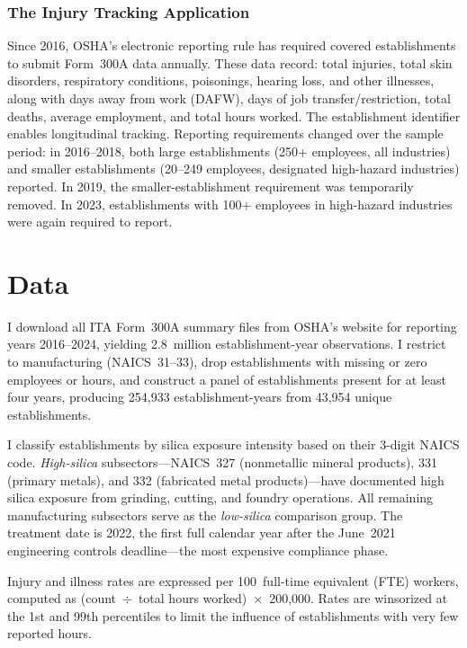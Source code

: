 \documentclass[12pt]{article}
\begin{document}
\subsubsection*{The Injury Tracking Application}
Since 2016, OSHA's electronic reporting rule has required covered establishments to submit Form~300A data annually. These data record: total injuries, total skin disorders, respiratory conditions, poisonings, hearing loss, and other illnesses, along with days away from work (DAFW), days of job transfer/restriction, total deaths, average employment, and total hours worked. The establishment identifier enables longitudinal tracking. Reporting requirements changed over the sample period: in 2016--2018, both large establishments (250+ employees, all industries) and smaller establishments (20--249 employees, designated high-hazard industries) reported. In 2019, the smaller-establishment requirement was temporarily removed. In 2023, establishments with 100+ employees in high-hazard industries were again required to report.


\section{Data}
\label{sec:data}

I download all ITA Form~300A summary files from OSHA's website for reporting years 2016--2024, yielding 2.8~million establishment-year observations. I restrict to manufacturing (NAICS~31--33), drop establishments with missing or zero employees or hours, and construct a panel of establishments present for at least four years, producing 254,933 establishment-years from 43,954 unique establishments.

I classify establishments by silica exposure intensity based on their 3-digit NAICS code. \textit{High-silica} subsectors---NAICS~327 (nonmetallic mineral products), 331 (primary metals), and 332 (fabricated metal products)---have documented high silica exposure from grinding, cutting, and foundry operations. All remaining manufacturing subsectors serve as the \textit{low-silica} comparison group. The treatment date is 2022, the first full calendar year after the June~2021 engineering controls deadline---the most expensive compliance phase.

Injury and illness rates are expressed per 100~full-time equivalent (FTE) workers, computed as (count~$\div$~total hours worked)~$\times$~200,000. Rates are winsorized at the 1st and 99th percentiles to limit the influence of establishments with very few reported hours.
\end{document}

